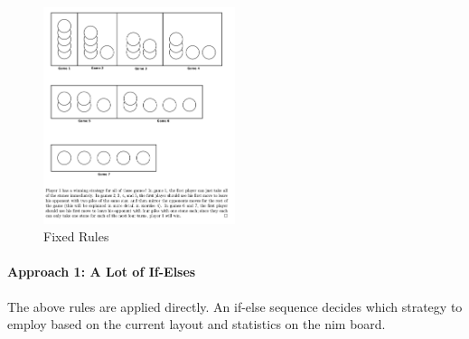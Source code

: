 \begin{figure}
    \centering
    \includegraphics[width=0.5\textwidth]{images/rules.png}
    \caption{Fixed Rules}
    \label{fig:fixed_rules}
\end{figure}


\paragraph{Approach 1: A Lot of If-Elses}
The above rules are applied directly. An if-else sequence decides which strategy to employ based on the current layout and statistics on the nim board.

